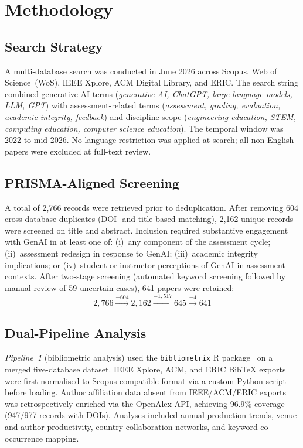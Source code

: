 \documentclass[conference]{IEEEtran}
\begin{document}
\section{Methodology}
\label{sec:method}

\subsection{Search Strategy}

A multi-database search was conducted in June 2026 across Scopus, Web of Science~(WoS), IEEE
Xplore, ACM Digital Library, and ERIC. The search string combined generative AI terms
(\textit{generative AI, ChatGPT, large language models, LLM, GPT}) with assessment-related
terms (\textit{assessment, grading, evaluation, academic integrity, feedback}) and discipline
scope (\textit{engineering education, STEM, computing education, computer science education}).
The temporal window was 2022 to mid-2026. No language restriction was applied at search; all
non-English papers were excluded at full-text review.

\subsection{PRISMA-Aligned Screening}

A total of 2,766 records were retrieved prior to deduplication. After removing 604
cross-database duplicates (DOI- and title-based matching), 2,162 unique records were screened
on title and abstract. Inclusion required substantive engagement with GenAI in at least one of:
(i)~any component of the assessment cycle; (ii)~assessment redesign in response to GenAI;
(iii)~academic integrity implications; or (iv)~student or instructor perceptions of GenAI in
assessment contexts. After two-stage screening (automated keyword screening followed by manual
review of 59 uncertain cases), 641 papers were retained:
\[
2{,}766 \xrightarrow{-604} 2{,}162 \xrightarrow{-1{,}517} 645 \xrightarrow{-4} 641
\]

\subsection{Dual-Pipeline Analysis}

\textit{Pipeline~1} (bibliometric analysis) used the \texttt{bibliometrix} R package~\cite{aria2017}
on a merged five-database dataset. IEEE Xplore, ACM, and ERIC BibTeX exports were first normalised
to Scopus-compatible format via a custom Python script before loading. Author affiliation data absent
from IEEE/ACM/ERIC exports was retrospectively enriched via the OpenAlex API, achieving 96.9\%
coverage (947/977 records with DOIs). Analyses included annual production trends, venue and author
productivity, country collaboration networks, and keyword co-occurrence mapping.
\end{document}
